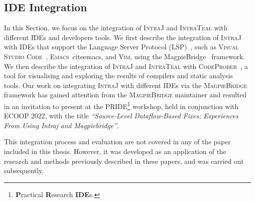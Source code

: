 \subsection{IDE Integration}
In this Section, we focus on the integration of \textsc{IntraJ} and \textsc{IntraTeal} with different
IDEs and developers tools. We first describe the integration of \textsc{IntraJ} with
IDEs that support the Language Server Protocol (LSP)~\cite{lsp}, such as
\textsc{Visual Studio Code}~\cite{vscode}, \textsc{Emacs}~cite{emacs}, and \textsc{Vim}\cite{vim}, using
the MagpieBridge~\cite{luo_et_al:LIPIcs:2019:10813} framework. We then describe the
integration of \textsc{IntraJ} and \textsc{IntraTeal} with \textsc{CodeProber}~\cite{risberg2022property},
a tool for visualising and exploring the results of compilers and static analysis tools.
Our work on integrating \textsc{IntraJ} with different IDEs via the \textsc{MagpieBridge} 
framework has gained attention from the \textsc{MagpieBridge} maintainer and resulted in an invitation
to present at the \textsc{PRIDE}\footnote{\textbf{P}ractical \textbf{R}esearch \textbf{IDE}s.} workshop, held in conjunction with \textsc{ECOOP 2022}, with the 
title \emph{``Source-Level Dataflow-Based Fixes: Experiences From Using Intraj and Magpiebridge''}. 

This integration process and evaluation are not covered in any of the paper included in this thesis.
However, it was developed as an application of the research and methods previously
described in these papers, and was carried out subsequently.

